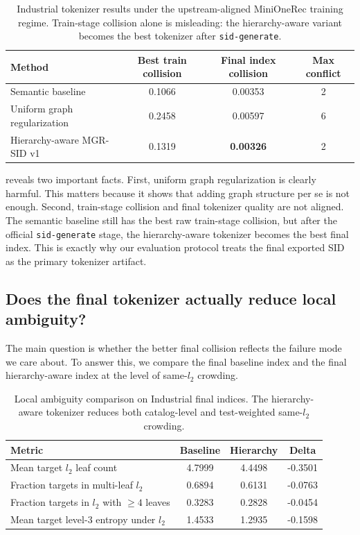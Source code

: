 \begin{table}[t]
  \centering
  \caption{Industrial tokenizer results under the upstream-aligned MiniOneRec training regime. Train-stage collision alone is misleading: the hierarchy-aware variant becomes the best tokenizer after \texttt{sid-generate}.}
  \label{tab:main}
  \begin{tabular}{lccc}
    \toprule
    Method & Best train collision & Final index collision & Max conflict \\
    \midrule
    Semantic baseline & 0.1066 & 0.00353 & 2 \\
    Uniform graph regularization & 0.2458 & 0.00597 & 6 \\
    Hierarchy-aware MGR-SID v1 & 0.1319 & \textbf{0.00326} & 2 \\
    \bottomrule
  \end{tabular}
\end{table}

 reveals two important facts. First, uniform graph regularization is clearly harmful. This matters because it shows that adding graph structure per se is not enough. Second, train-stage collision and final tokenizer quality are not aligned. The semantic baseline still has the best raw train-stage collision, but after the official \texttt{sid-generate} stage, the hierarchy-aware tokenizer becomes the best final index. This is exactly why our evaluation protocol treats the final exported SID as the primary tokenizer artifact.

\subsection{Does the final tokenizer actually reduce local ambiguity?}

The main question is whether the better final collision reflects the failure mode we care about. To answer this, we compare the final baseline index and the final hierarchy-aware index at the level of same-$l_2$ crowding.

\begin{table}[t]
  \centering
  \caption{Local ambiguity comparison on Industrial final indices. The hierarchy-aware tokenizer reduces both catalog-level and test-weighted same-$l_2$ crowding.}
  \label{tab:ambiguity}
  \begin{tabular}{lccc}
    \toprule
    Metric & Baseline & Hierarchy & Delta \\
    \midrule
    Mean target $l_2$ leaf count & 4.7999 & 4.4498 & -0.3501 \\
    Fraction targets in multi-leaf $l_2$ & 0.6894 & 0.6131 & -0.0763 \\
    Fraction targets in $l_2$ with $\ge 4$ leaves & 0.3283 & 0.2828 & -0.0454 \\
    Mean target level-3 entropy under $l_2$ & 1.4533 & 1.2935 & -0.1598 \\
    \bottomrule
  \end{tabular}
\end{table}


